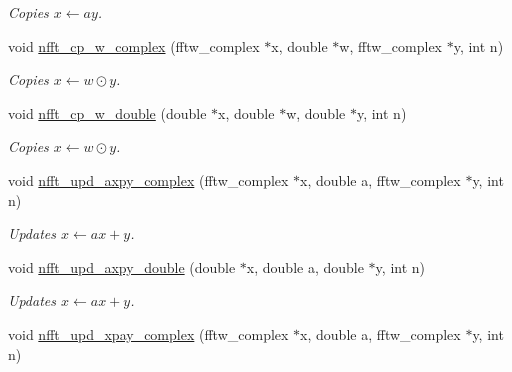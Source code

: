 \begin{CompactItemize}
\begin{CompactList}\small\item\em Copies $x \leftarrow a y$. \item\end{CompactList}\item 
\hypertarget{group__nfftutil_g630054cb816785d766959a867965f619}{
void \hyperlink{group__nfftutil_g630054cb816785d766959a867965f619}{nfft\_\-cp\_\-w\_\-complex} (fftw\_\-complex $\ast$x, double $\ast$w, fftw\_\-complex $\ast$y, int n)}
\label{group__nfftutil_g630054cb816785d766959a867965f619}

\begin{CompactList}\small\item\em Copies $x \leftarrow w\odot y$. \item\end{CompactList}\item 
\hypertarget{group__nfftutil_g27a75e17d21c508cacf81276ca531099}{
void \hyperlink{group__nfftutil_g27a75e17d21c508cacf81276ca531099}{nfft\_\-cp\_\-w\_\-double} (double $\ast$x, double $\ast$w, double $\ast$y, int n)}
\label{group__nfftutil_g27a75e17d21c508cacf81276ca531099}

\begin{CompactList}\small\item\em Copies $x \leftarrow w\odot y$. \item\end{CompactList}\item 
\hypertarget{group__nfftutil_g676395f56bbf1c444d074a21753de8d5}{
void \hyperlink{group__nfftutil_g676395f56bbf1c444d074a21753de8d5}{nfft\_\-upd\_\-axpy\_\-complex} (fftw\_\-complex $\ast$x, double a, fftw\_\-complex $\ast$y, int n)}
\label{group__nfftutil_g676395f56bbf1c444d074a21753de8d5}

\begin{CompactList}\small\item\em Updates $x \leftarrow a x + y$. \item\end{CompactList}\item 
\hypertarget{group__nfftutil_g7610a506bc5ab40a6e1d7937b36921a3}{
void \hyperlink{group__nfftutil_g7610a506bc5ab40a6e1d7937b36921a3}{nfft\_\-upd\_\-axpy\_\-double} (double $\ast$x, double a, double $\ast$y, int n)}
\label{group__nfftutil_g7610a506bc5ab40a6e1d7937b36921a3}

\begin{CompactList}\small\item\em Updates $x \leftarrow a x + y$. \item\end{CompactList}\item 
\hypertarget{group__nfftutil_g1fde8da1b69413398fca44e2ef2fbdb4}{
void \hyperlink{group__nfftutil_g1fde8da1b69413398fca44e2ef2fbdb4}{nfft\_\-upd\_\-xpay\_\-complex} (fftw\_\-complex $\ast$x, double a, fftw\_\-complex $\ast$y, int n)}
\label{group__nfftutil_g1fde8da1b69413398fca44e2ef2fbdb4}


\end{CompactItemize}
